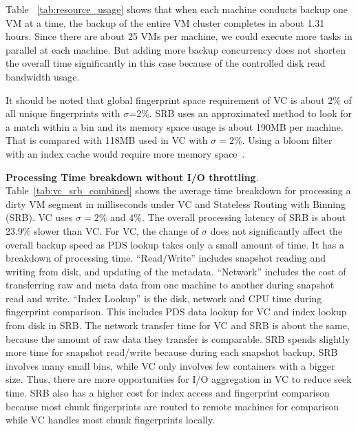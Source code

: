 Table ~\ref{tab:resource_usage} shows that when  each machine conducts
backup one VM at a time, the backup of the entire
VM cluster completes in about 1.31 hours. Since there are about 25 VMs per machine, we could execute
more tasks in parallel at each machine. But adding more backup concurrency does not shorten the overall time
significantly in this case because of the controlled  disk read bandwidth usage.

It should be noted that global fingerprint  space requirement of VC is about 2\% of all unique fingerprints 
with $\sigma$=2\%. SRB uses an approximated method to look for a match within a bin and
its memory space usage is about 190MB per machine. That is compared with 118MB used in VC with $\sigma=2\%$.
Using a bloom filter with an index cache would require more memory space~\cite{Dong2011}.

 

{\bf Processing Time breakdown without I/O throttling}.
Table~\ref{tab:vc_srb_combined} shows
the  average  time breakdown for processing a dirty VM segment in milliseconds
under VC and Stateless Routing with Binning (SRB). 
VC uses $\sigma=2\%$ and $4\%$.
The overall processing latency of SRB is about 23.9\% slower than VC.
For VC, the change of $\sigma$ does not significantly affect the overall backup speed as
PDS lookup takes only a small amount of time. 
It has a breakdown of processing time.
``Read/Write'' includes snapshot reading and writing from disk, and 
updating of the metadata.
``Network'' includes the cost of transferring raw and meta data from one machine to another during 
snapshot read and write.
``Index Lookup'' is the disk, network and CPU time during fingerprint comparison.
This includes PDS data lookup for VC and index lookup from disk in SRB. 
The network transfer time for VC and SRB is about the same, because the 
amount of raw data they transfer is comparable.
SRB spends slightly more time for snapshot read/write because during each snapshot  backup, SRB involves many small bins,
 while VC only involves few containers with a bigger size. Thus, there are more opportunities for I/O aggregation in VC to reduce seek time.
SRB also has a higher cost for index access and fingerprint comparison because most chunk fingerprints are routed
to remote machines for comparison while   VC handles most chunk fingerprints locally. 

